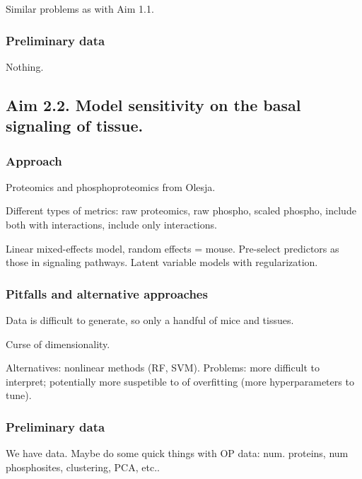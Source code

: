 Similar problems as with Aim 1.1.

\subsubsection*{Preliminary data}

Nothing.



\subsection*{Aim 2.2. Model \KRAS{} sensitivity on the basal signaling of tissue.}

\subsubsection*{Approach}

Proteomics and phosphoproteomics from Olesja.

Different types of metrics: raw proteomics, raw phospho, scaled phospho, include both with interactions, include only interactions.

Linear mixed-effects model, random effects = mouse.
Pre-select predictors as those in signaling pathways.
Latent variable models with regularization.

\subsubsection*{Pitfalls and alternative approaches}

Data is difficult to generate, so only a handful of mice and tissues.

Curse of dimensionality.

Alternatives: nonlinear methods (RF, SVM). Problems: more difficult to interpret; potentially more suspetible to of overfitting (more hyperparameters to tune).

\subsubsection*{Preliminary data}

We have data.
Maybe do some quick things with OP data: num. proteins, num phosphosites, clustering, PCA, etc..



